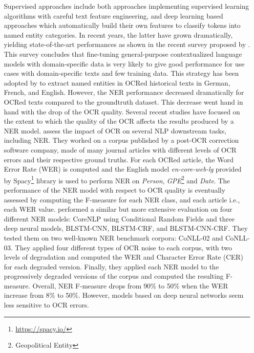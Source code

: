 Supervised approaches include both approaches implementing supervised learning algorithms with careful text feature engineering, and deep learning based approaches which automatically build their own features to classify tokens into named entity categories.
In recent years, the latter have grown dramatically, yielding state-of-the-art performances as shown in the recent survey proposed by \cite{li2020}. This survey concludes that fine-tuning general-purpose contextualized language models with domain-specific data is very likely to give good performance for use cases with domain-specific texts and few training data. This strategy has been adopted by \cite{Labusch2020NamedED} to extract named entities in OCRed historical texts in German, French, and English. However, the NER performance decreased dramatically for OCRed texts compared to the groundtruth dataset. This decrease went hand in hand with the drop of the OCR quality. 
Several recent studies have focused on the extent to which the quality of the OCR affects the results produced by a NER model.
\cite{van2020assessing} assess the impact of OCR on several NLP downstream tasks, including NER. They worked on a corpus published by a post-OCR correction software company, made of many journal articles with different levels of OCR errors and their respective ground truths.
For each OCRed article, the Word Error Rate (WER) is computed and the English model \textit{en-core-web-lg} provided by Spacy\footnote{\url{https://spacy.io/}} library is used to perform NER on \textit{Person}, \textit{GPE}\footnote{Geopolitical Entity} and \textit{Date}.
The performance of the NER model with respect to OCR quality is eventually assessed by computing the F-measure for each NER class, and each article i.e., each WER value.
\cite{hamdi2020assessing} performed a similar but more extensive evaluation on four different NER models: CoreNLP using Conditional Random Fields and three deep neural models, BLSTM-CNN, BLSTM-CRF, and BLSTM-CNN-CRF.
They tested them on two well-known NER benchmark corpora: CoNLL-02 and CoNLL-03. They applied four different types of OCR noise to each corpus, with two levels of degradation and computed the WER and Character Error Rate (CER) for each degraded version.
Finally, they applied each NER model to the progressively degraded versions of the corpus and computed the resulting F-measure.
Overall, NER F-measure drops from 90\% to 50\% when the WER increase from 8\% to 50\%. However, models based on deep neural networks seem less sensitive to OCR errors.

